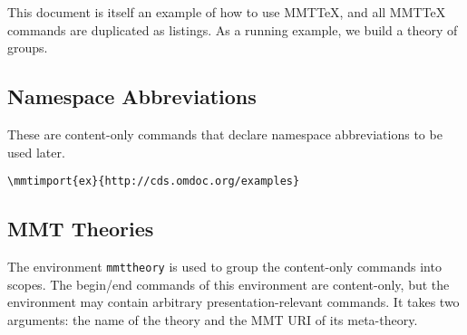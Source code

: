\documentclass{article}
\begin{document}
This document is itself an example of how to use MMTTeX, and all MMTTeX commands are duplicated as listings.
As a running example, we build a theory of groups.

\subsection{Namespace Abbreviations}

These are content-only commands that declare namespace abbreviations to be used later.

\begin{lstlisting}
\mmtimport{ex}{http://cds.omdoc.org/examples}
\end{lstlisting}

\subsection{MMT Theories}

The environment \lstinline|mmttheory| is used to group the content-only commands into scopes.
The begin/end commands of this environment are content-only, but the environment may contain arbitrary presentation-relevant commands.
It takes two arguments: the name of the theory and the MMT URI of its meta-theory.
\end{document}
